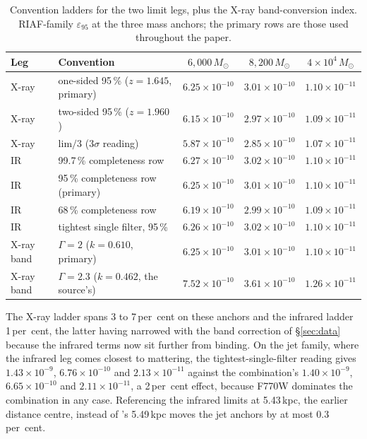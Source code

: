 \documentclass[11pt]{article}
\newcommand{\msun}{\ensuremath{M_\odot}}
\newcommand{\epsl}{\ensuremath{\varepsilon_{95}}}
\begin{document}
\begin{table}[htbp]
\centering
\small
\caption{Convention ladders for the two limit legs, plus the X-ray band-conversion index. RIAF-family $\epsl$ at the three mass anchors; the primary rows are those used throughout the paper.}
\label{tab:ladders}
\begin{tabular}{llccc}
\toprule
Leg & Convention & $6{,}000\,\msun$ & $8{,}200\,\msun$ & $4\times10^{4}\,\msun$ \\
\midrule
X-ray & one-sided 95\,\% ($z{=}1.645$, primary) & $6.25\times10^{-10}$ & $3.01\times10^{-10}$ & $1.10\times10^{-11}$ \\
X-ray & two-sided 95\,\% ($z{=}1.960$) & $6.15\times10^{-10}$ & $2.97\times10^{-10}$ & $1.09\times10^{-11}$ \\
X-ray & $\mathrm{lim}/3$ ($3\sigma$ reading) & $5.87\times10^{-10}$ & $2.85\times10^{-10}$ & $1.07\times10^{-11}$ \\
\midrule
IR & 99.7\,\% completeness row & $6.27\times10^{-10}$ & $3.02\times10^{-10}$ & $1.10\times10^{-11}$ \\
IR & 95\,\% completeness row (primary) & $6.25\times10^{-10}$ & $3.01\times10^{-10}$ & $1.10\times10^{-11}$ \\
IR & 68\,\% completeness row & $6.19\times10^{-10}$ & $2.99\times10^{-10}$ & $1.09\times10^{-11}$ \\
IR & tightest single filter, 95\,\% & $6.26\times10^{-10}$ & $3.02\times10^{-10}$ & $1.10\times10^{-11}$ \\
\midrule
X-ray band & $\Gamma = 2$ ($k = 0.610$, primary) & $6.25\times10^{-10}$ & $3.01\times10^{-10}$ & $1.10\times10^{-11}$ \\
X-ray band & $\Gamma = 2.3$ ($k = 0.462$, the source's) & $7.52\times10^{-10}$ & $3.61\times10^{-10}$ & $1.26\times10^{-11}$ \\
\bottomrule
\end{tabular}
\end{table}

The X-ray ladder spans 3 to 7\,per~cent on these anchors and the infrared ladder 1\,per~cent, the latter having narrowed with the band correction of \S\ref{sec:data} because the infrared terms now sit further from binding. On the jet family, where the infrared leg comes closest to mattering, the tightest-single-filter reading gives $1.43\times10^{-9}$, $6.76\times10^{-10}$ and $2.13\times10^{-11}$ against the combination's $1.40\times10^{-9}$, $6.65\times10^{-10}$ and $2.11\times10^{-11}$, a 2\,per~cent effect, because F770W dominates the combination in any case. Referencing the infrared limits at 5.43\,kpc, the earlier distance centre, instead of \citeauthor{Chen2025JWST}'s 5.49\,kpc moves the jet anchors by at most 0.3\,per~cent.
\end{document}

